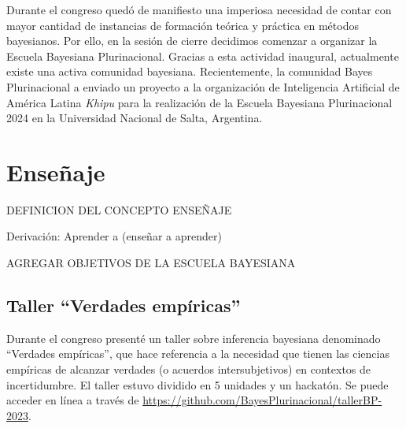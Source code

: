 \documentclass[a4paper,11pt]{book}
\theoremstyle{definition}
\begin{document}

Durante el congreso qued\'o de manifiesto una imperiosa necesidad de contar con mayor cantidad de instancias de formaci\'on te\'orica y pr\'actica en m\'etodos bayesianos.
%
Por ello, en la sesi\'on de cierre decidimos comenzar a organizar la Escuela Bayesiana Plurinacional.
%
Gracias a esta actividad inaugural, actualmente existe una activa comunidad bayesiana.
%
Recientemente, la comunidad Bayes Plurinacional a enviado un proyecto a la organizaci\'on de Inteligencia Artificial de Am\'erica Latina \emph{Khipu} para la realizaci\'on de la Escuela Bayesiana Plurinacional 2024 en la Universidad Nacional de Salta, Argentina.


\section{Ense\~naje}

DEFINICION DEL CONCEPTO ENSE\~NAJE

Derivaci\'on: Aprender a (ense\~nar a aprender)

AGREGAR OBJETIVOS DE LA ESCUELA BAYESIANA

\subsection{Taller ``Verdades emp\'iricas''}

Durante el congreso present\'e un taller sobre inferencia bayesiana denominado ``Verdades emp\'iricas'', que hace referencia a la necesidad que tienen las ciencias emp\'iricas de alcanzar verdades (o acuerdos intersubjetivos) en contextos de incertidumbre.
%
El taller estuvo dividido en 5 unidades y un hackat\'on.
%
Se puede acceder en l\'inea a trav\'es de \url{https://github.com/BayesPlurinacional/tallerBP-2023}.

\end{document}
